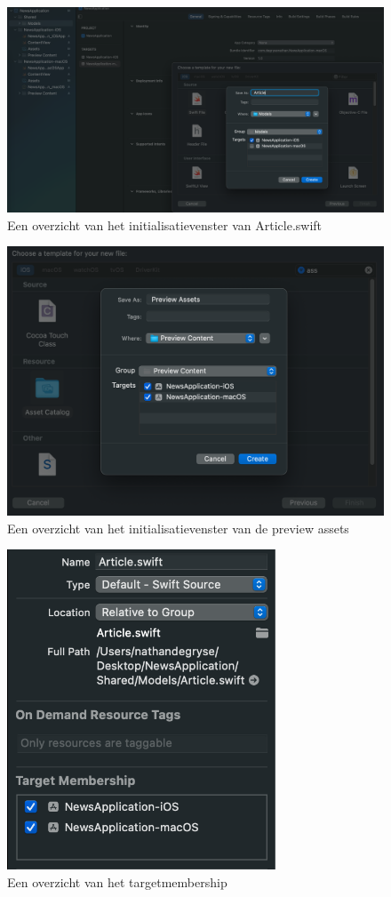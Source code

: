 \begin{figure}[h]
    \centering
    \includegraphics[width=\linewidth]{img/articleswift.png}
    \caption{Een overzicht van het initialisatievenster van Article.swift}
\end{figure}

\begin{figure}[h]
    \centering
    \includegraphics[width=\linewidth]{img/previewassets.png}
    \caption{Een overzicht van het initialisatievenster van de preview assets}
\end{figure}

\begin{figure}[h]
    \centering
    \includegraphics[width=80mm, scale=0.5]{img/articletargetmembership.png}
    \caption{Een overzicht van het targetmembership}
\end{figure}

